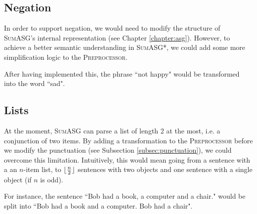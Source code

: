 \subsection{Negation}

In order to support negation, we would need to modify the structure of \textsc{SumASG}'s internal representation (see Chapter \ref{chapter:asg}). However, to achieve a better semantic understanding in \textsc{SumASG*}, we could add some more simplification logic to the \textsc{Preprocessor}.

After having implemented this, the phrase ``not happy" would be transformed into the word ``sad".

\subsection{Lists}

At the moment, \textsc{SumASG} can parse a list of length 2 at the most, i.e. a conjunction of two items. By adding a transformation to the \textsc{Preprocessor} before we modify the punctuation (see Subsection \ref{subsec:punctuation}), we could overcome this limitation. Intuitively, this would mean going from a sentence with a an $n$-item list, to $\lfloor \frac{n}{2} \rfloor$ sentences with two objects and one sentence with a single object (if $n$ is odd).

For instance, the sentence ``Bob had a book, a computer and a chair." would be split into ``Bob had a book and a computer. Bob had a chair".